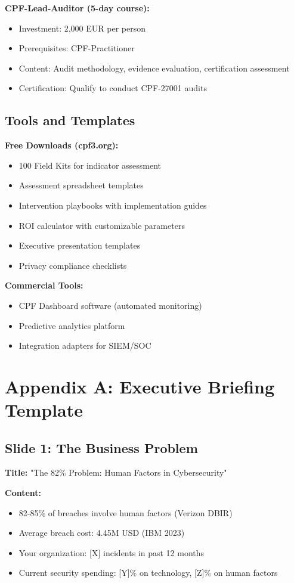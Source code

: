 \documentclass[11pt,a4paper]{article}
\begin{document}
\textbf{CPF-Lead-Auditor (5-day course):}
\begin{itemize}
\item Investment: 2,000 EUR per person
\item Prerequisites: CPF-Practitioner
\item Content: Audit methodology, evidence evaluation, certification assessment
\item Certification: Qualify to conduct CPF-27001 audits
\end{itemize}

\subsection{Tools and Templates}

\textbf{Free Downloads (cpf3.org):}
\begin{itemize}
\item 100 Field Kits for indicator assessment
\item Assessment spreadsheet templates
\item Intervention playbooks with implementation guides
\item ROI calculator with customizable parameters
\item Executive presentation templates
\item Privacy compliance checklists
\end{itemize}

\textbf{Commercial Tools:}
\begin{itemize}
\item CPF Dashboard software (automated monitoring)
\item Predictive analytics platform
\item Integration adapters for SIEM/SOC
\end{itemize}

\appendix

\section{Appendix A: Executive Briefing Template}

\subsection{Slide 1: The Business Problem}

\textbf{Title:} "The 82\% Problem: Human Factors in Cybersecurity"

\textbf{Content:}
\begin{itemize}
\item 82-85\% of breaches involve human factors (Verizon DBIR)
\item Average breach cost: 4.45M USD (IBM 2023)
\item Your organization: [X] incidents in past 12 months
\item Current security spending: [Y]\% on technology, [Z]\% on human factors
\end{itemize}
\end{document}
